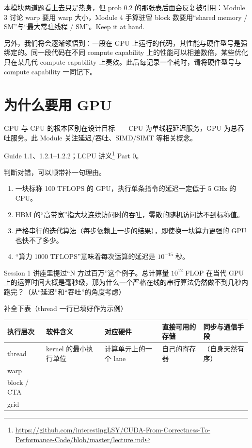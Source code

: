 \documentclass[11pt,a4paper,fontset=none]{ctexart}
\begin{document}
\begin{lookback}
本模块两道题看上去只是热身，但 prob 0.2 的那张表后面会反复被引用：Module 3 讨论 warp 要用 warp 大小，Module 4 手算驻留 block 数要用“shared memory / SM”与“最大常驻线程 / SM”。Keep it at hand.

另外，我们将会逐渐领悟到：一段在 GPU 上运行的代码，其性能与硬件型号是强绑定的。同一段代码在不同 compute capability 上的性能可以相差数倍，某些优化只在某几代 compute capability 上奏效。此后每记录一个耗时，请将硬件型号与 compute capability 一同记下。
\end{lookback}

\section{为什么要用 GPU}

GPU 与 CPU 的根本区别在设计目标——CPU 为单线程延迟服务，GPU 为总吞吐服务。此 Module 关注延迟/吞吐、SIMD/SIMT 等相关概念。

\begin{reading}
Guide 1.1、1.2.1--1.2.2；LCPU 讲义\footnote{\url{https://github.com/interestingLSY/CUDA-From-Correctness-To-Performance-Code/blob/master/lecture.md}} Part 0。
\end{reading}

判断对错，可以顺带补一句理由。
\begin{enumerate}[label=(\alph*)]
  \item 一块标称 100 TFLOPS 的 GPU，执行单条指令的延迟一定低于 5 GHz 的 CPU。
  \item HBM 的“高带宽”指大块连续访问时的吞吐，零散的随机访问达不到标称值。
  \item 严格串行的迭代算法（每步依赖上一步的结果），即使换一块算力更强的 GPU 也快不了多少。
  \item “算力 1000 TFLOPS”意味着每次运算的延迟是 $10^{-15}$ 秒。
\end{enumerate}

Session 1 讲座里提过“N 方过百万”这个例子。总计算量 $10^{12}$ FLOP 在当代 GPU 上的运算时间大概是毫秒级，那为什么一个严格在线的串行算法仍然做不到几秒内跑完？（从“延迟”和“吞吐”的角度考虑）

补全下表（thread 一行已填好作为示例）

\begin{center}\small
\begin{tabular}{@{}p{5.2em}p{9em}p{7.5em}p{7.5em}p{8em}@{}}
\toprule
执行层次 & 软件含义 & 对应硬件 & 直接可用的存储 & 同步与通信手段 \\
\midrule
thread & kernel 的最小执行单位 & 计算单元上的一个 lane & 自己的寄存器 & （自身天然有序） \\
warp &  &  &  &  \\
block / CTA &  &  &  &  \\
grid &  &  &  &  \\
\bottomrule
\end{tabular}
\end{center}
\end{document}
